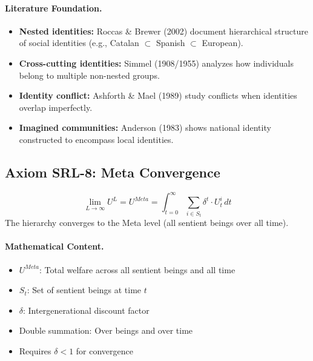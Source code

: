 \paragraph{Literature Foundation.}
\begin{itemize}
\item \textbf{Nested identities:} Roccas \& Brewer (2002) document hierarchical 
structure of social identities (e.g., Catalan $\subset$ Spanish $\subset$ European).
\item \textbf{Cross-cutting identities:} Simmel (1908/1955) analyzes how 
individuals belong to multiple non-nested groups.
\item \textbf{Identity conflict:} Ashforth \& Mael (1989) study conflicts when 
identities overlap imperfectly.
\item \textbf{Imagined communities:} Anderson (1983) shows national identity 
constructed to encompass local identities.
\end{itemize}

\subsection{Axiom SRL-8: Meta Convergence}

\begin{tcolorbox}[colback=gray!5!white, colframe=gray!75!black, title=Axiom SRL-8: Meta Convergence]
\begin{equation}
\boxed{
\lim_{L \to \infty} U^L = U^{Meta} = \int_{t=0}^{\infty} \sum_{i \in S_t} \delta^t \cdot U^i_t \, dt
}
\end{equation}
The hierarchy converges to the Meta level (all sentient beings over all time).
\end{tcolorbox}

\paragraph{Mathematical Content.}
\begin{itemize}
\item $U^{Meta}$: Total welfare across all sentient beings and all time
\item $S_t$: Set of sentient beings at time $t$
\item $\delta$: Intergenerational discount factor
\item Double summation: Over beings and over time
\item Requires $\delta < 1$ for convergence
\end{itemize}

